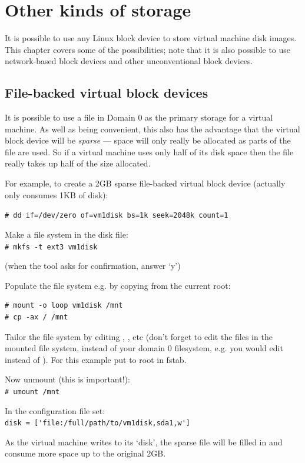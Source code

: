 \documentclass[11pt,twoside,final,openright]{xenstyle}
\begin{document}
\chapter{Other kinds of storage}

It is possible to use any Linux block device to store virtual machine
disk images.  This chapter covers some of the possibilities; note that
it is also possible to use network-based block devices and other
unconventional block devices.

\section{File-backed virtual block devices}

It is possible to use a file in Domain 0 as the primary storage for a
virtual machine.  As well as being convenient, this also has the
advantage that the virtual block device will be {\em sparse} --- space
will only really be allocated as parts of the file are used.  So if a
virtual machine uses only half of its disk space then the file really
takes up half of the size allocated.

For example, to create a 2GB sparse file-backed virtual block device
(actually only consumes 1KB of disk):

\verb_# dd if=/dev/zero of=vm1disk bs=1k seek=2048k count=1_

Make a file system in the disk file: \\
\verb_# mkfs -t ext3 vm1disk_

(when the tool asks for confirmation, answer `y')

Populate the file system e.g. by copying from the current root:
\begin{verbatim}
# mount -o loop vm1disk /mnt
# cp -ax / /mnt
\end{verbatim}
Tailor the file system by editing ,
, etc (don't forget to edit the files in the
mounted file system, instead of your domain 0 filesystem, e.g. you
would edit  instead of  ).  For
this example put  to root in fstab.

Now unmount (this is important!):\\
\verb_# umount /mnt_

In the configuration file set:\\
\verb_disk = ['file:/full/path/to/vm1disk,sda1,w']_

As the virtual machine writes to its `disk', the sparse file will be
filled in and consume more space up to the original 2GB.
\end{document}
